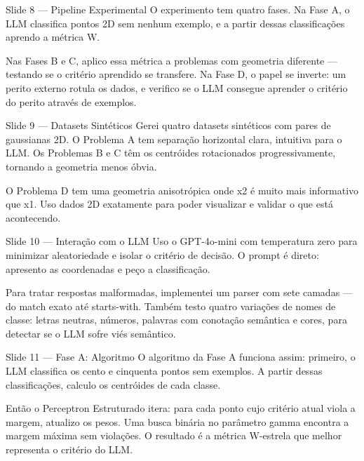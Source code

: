 \documentclass[aspectratio=169, 14pt]{beamer}
\begin{document}
\begin{frame}{Slide 8 — Pipeline Experimental}
  O experimento tem quatro fases. Na Fase A, o LLM classifica pontos 2D sem nenhum exemplo, e a partir dessas classificações aprendo a métrica W.

  Nas Fases B e C, aplico essa métrica a problemas com geometria diferente — testando se o critério aprendido se transfere. Na Fase D, o papel se inverte: um perito externo rotula os dados, e verifico se o LLM consegue aprender o critério do perito através de exemplos.
\end{frame}

\begin{frame}{Slide 9 — Datasets Sintéticos}
  Gerei quatro datasets sintéticos com pares de gaussianas 2D. O Problema A tem separação horizontal clara, intuitiva para o LLM. Os Problemas B e C têm os centróides rotacionados progressivamente, tornando a geometria menos óbvia.

  O Problema D tem uma geometria anisotrópica onde x2 é muito mais informativo que x1. Uso dados 2D exatamente para poder visualizar e validar o que está acontecendo.
\end{frame}

\begin{frame}{Slide 10 — Interação com o LLM}
  Uso o GPT-4o-mini com temperatura zero para minimizar aleatoriedade e isolar o critério de decisão. O prompt é direto: apresento as coordenadas e peço a classificação.

  Para tratar respostas malformadas, implementei um parser com sete camadas — do match exato até starts-with. Também testo quatro variações de nomes de classe: letras neutras, números, palavras com conotação semântica e cores, para detectar se o LLM sofre viés semântico.
\end{frame}

\begin{frame}{Slide 11 — Fase A: Algoritmo}
  O algoritmo da Fase A funciona assim: primeiro, o LLM classifica os cento e cinquenta pontos sem exemplos. A partir dessas classificações, calculo os centróides de cada classe.

  Então o Perceptron Estruturado itera: para cada ponto cujo critério atual viola a margem, atualizo os pesos. Uma busca binária no parâmetro gamma encontra a margem máxima sem violações. O resultado é a métrica W-estrela que melhor representa o critério do LLM.
\end{frame}
\end{document}
